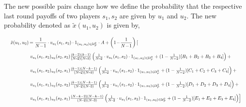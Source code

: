 \documentclass[11pt]{article}
\theoremstyle{plainCl1}
\theoremstyle{plainCl2}
\begin{document}
The new possible pairs change how we define the probability that the
respective last round payoffs of two players \(s_1, s_2\) are given by \(u_1\)
and \(u_2\). The new probability denoted as \(\tilde{x}(u_1,u_2)\) is given by,

\begin{equation}
  \resizebox{.99\textwidth}{!}
  {%
$
  \setlength{\arraycolsep}{1pt}
  \begin{array}{llrl}
  \tilde{x}(u_1,u_2)	& = \displaystyle \frac{1}{N\!-\!1}\cdot v_{u_1}(s_1,s_2)\cdot 1_{(u_1,u_2)\in \mathcal{U}^2_F} \cdot A + \left(1\!-\!\frac{1}{N\!-\!1}\right) \left[ \right. \\[0.5cm] 
  & \left. v_{u_1}(s_1,s_2) _{u_2}(s_2,s_2)  \frac{\left(k - 2\right) \left(k - 1\right)}{(N\!-\!2)(N\!-\!3)}
  \left(\frac{1}{N\!-\!2}\cdot v_{u_1}(s_1,s_2)\cdot 1_{(u_1,u_2)\in \mathcal{U}^2_F} + (1 - \frac{1}{N - 2}) [B_1 + B_2 + B_3 + B_4]\right) + \right. \\[0.5cm] 
  & \left. v_{u_1}(s_1,s_2) _{u_2}(s_2,s_1)  \frac{\left(k - 1\right) \left(N - k - 1\right)}{(N\!-\!2)(N\!-\!3)} \left(\frac{1}{N\!-\!2}\cdot v_{u_1}(s_1,s_2)\cdot 1_{(u_1,u_2)\in \mathcal{U}^2_F} + (1 - \frac{1}{N - 2}) [C_1 + C_2 + C_3 + C_4]\right) + \right. \\[0.5cm] 
  & \left. v_{u_1}(s_1,s_1) _{u_2}(s_2,s_2)  \frac{\left(k - 1\right) \left(N - k - 1\right)}{(N\!-\!2)(N\!-\!3)} \left(\frac{1}{N\!-\!2}\cdot v_{u_1}(s_1,s_2)\cdot 1_{(u_1,u_2)\in \mathcal{U}^2_F} + (1 - \frac{1}{N - 2}) [D_1 + D_2 + D_3 + D_4]\right) + \right. \\[0.5cm] 
  & \left. v_{u_1}(s_1,s_1) _{u_2}(s_2,s_1)  \frac{\left(N - k - 2\right) \left(N - k - 1\right)}{(N\!-\!2)(N\!-\!3)} \left(\frac{1}{N\!-\!2}\cdot v_{u_1}(s_1,s_2)\cdot 1_{(u_1,u_2)\in \mathcal{U}^2_F} + (1 - \frac{1}{N - 2}) [E_1 + E_2 + E_3 + E_4]\right) \right]
  \end{array} $}
\end{equation}
\end{document}
